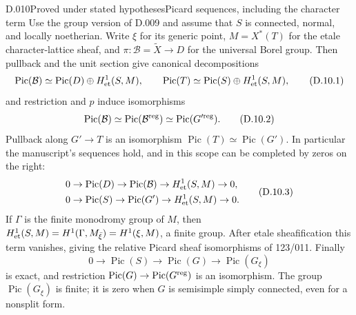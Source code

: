 \begin{saresult}{D.010}{Proved under stated hypotheses}{Picard sequences, including the character term}
Use the group version of D.009 and assume that $S$ is connected,
normal, and locally noetherian.  Write $\xi$ for its generic point,
$M=X^*(T)$ for the etale character-lattice sheaf, and
$\pi:\mathcal B=\widetilde X\to D$ for the universal Borel group.
Then pullback and the unit section give canonical decompositions
\[
 \operatorname{Pic}(\mathcal B)
   \simeq\operatorname{Pic}(D)\oplus H^1_{\rm et}(S,M),
 \qquad
 \operatorname{Pic}(T)
   \simeq\operatorname{Pic}(S)\oplus H^1_{\rm et}(S,M),
                                                        \tag{D.10.1}
\]
and restriction and $p$ induce isomorphisms
\[
 \operatorname{Pic}(\mathcal B)
 \simeq\operatorname{Pic}(\mathcal B^{\rm reg})
 \simeq\operatorname{Pic}(G'^{\rm reg}).                   \tag{D.10.2}
\]
Pullback along $G'\to T$ is an isomorphism
$\operatorname{Pic}(T)\simeq\operatorname{Pic}(G')$.
In particular the manuscript's sequences hold, and in this scope can
be completed by zeros on the right:
\[
\begin{split}
0&\to\operatorname{Pic}(D)\to\operatorname{Pic}(\mathcal B)
       \to H^1_{\rm et}(S,M)\to0,\\
0&\to\operatorname{Pic}(S)\to\operatorname{Pic}(G')
       \to H^1_{\rm et}(S,M)\to0.
\end{split}                                             \tag{D.10.3}
\]
If $\Gamma$ is the finite monodromy group of $M$, then
$H^1_{\rm et}(S,M)=H^1(\Gamma,M_{\bar\xi})
=H^1(\xi,M)$, a finite group.  After etale sheafification this term
vanishes, giving the relative Picard sheaf isomorphisms of 123/011.
Finally
\[
0\to\operatorname{Pic}(S)\to\operatorname{Pic}(G)
       \to\operatorname{Pic}(G_\xi)
\]
is exact, and restriction
$\operatorname{Pic}(G)\to\operatorname{Pic}(G^{\rm reg})$
is an isomorphism.  The group $\operatorname{Pic}(G_\xi)$ is finite;
it is zero when $G$ is semisimple simply connected, even for a
nonsplit form.
\end{saresult}
